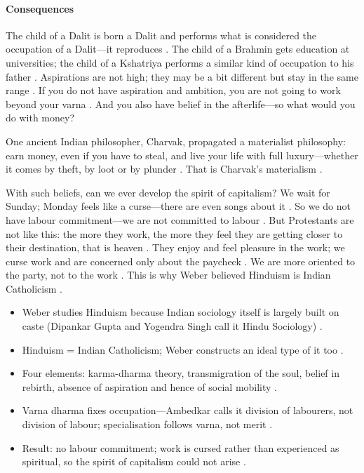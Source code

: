 \paragraph{Consequences}
The child of a Dalit is born a Dalit and performs what is considered the occupation of a Dalit---it reproduces . The child of a Brahmin gets education at universities; the child of a Kshatriya performs a similar kind of occupation to his father . Aspirations are not high; they may be a bit different but stay in the same range .
If you do not have aspiration and ambition, you are not going to work beyond your varna . And you also have belief in the afterlife---so what would you do with money? 

\begin{ExampleBox}
One ancient Indian philosopher, Charvak, propagated a materialist philosophy: earn money, even if you have to steal, and live your life with full luxury---whether it comes by theft, by loot or by plunder . That is Charvak's materialism .
\end{ExampleBox}

\begin{CriticalPoint}
With such beliefs, can we ever develop the spirit of capitalism? We wait for Sunday; Monday feels like a curse---there are even songs about it .
So we do not have labour commitment---we are not committed to labour . But Protestants are not like this: the more they work, the more they feel they are getting closer to their destination, that is heaven .
They enjoy and feel pleasure in the work; we curse work and are concerned only about the paycheck . We are more oriented to the party, not to the work . This is why Weber believed Hinduism is Indian Catholicism .
\end{CriticalPoint}

\begin{QuickRevision}
\begin{itemize}
    \item Weber studies Hinduism because Indian sociology itself is largely built on caste (Dipankar Gupta and Yogendra Singh call it Hindu Sociology) .
    \item Hinduism = Indian Catholicism; Weber constructs an ideal type of it too .
    \item Four elements: karma-dharma theory, transmigration of the soul, belief in rebirth, absence of aspiration and hence of social mobility .
    \item Varna dharma fixes occupation---Ambedkar calls it division of labourers, not division of labour; specialisation follows varna, not merit .
    \item Result: no labour commitment; work is cursed rather than experienced as spiritual, so the spirit of capitalism could not arise .
\end{itemize}
\end{QuickRevision}

